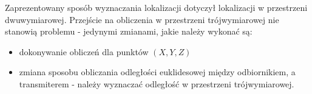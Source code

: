 Zaprezentowany sposób wyznaczania lokalizacji dotyczył lokalizacji w przestrzeni dwuwymiarowej. Przejście na obliczenia w przestrzeni trójwymiarowej nie stanowią problemu - jedynymi zmianami, jakie należy wykonać są:
\begin{itemize}
	\item dokonywanie obliczeń dla punktów $(X,Y,Z)$
	\item zmiana sposobu obliczania odległości euklidesowej między odbiornikiem, a transmiterem - należy wyznaczać odległość w przestrzeni trójwymiarowej.
\end{itemize}
